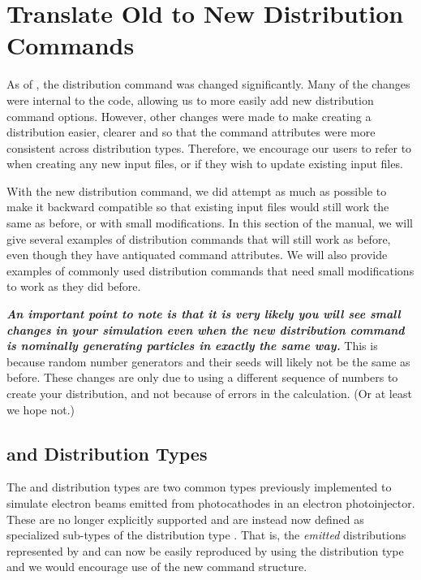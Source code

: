 \clearpage


\section{Translate Old to New Distribution Commands}
\label{sec:oldtonewdist}
As of , the distribution command  was changed significantly. Many of the changes were internal to the code, allowing us to more easily add new distribution command options. However, other changes were made to make creating a distribution easier, clearer and so that the command attributes were more consistent across distribution types. Therefore, we encourage our users to refer to  when creating any new input files, or if they wish to update existing input files.

With the new distribution command, we did attempt as much as possible to make it backward compatible so that existing \opal input files would still work the same as before, or with small modifications. In this section of the manual, we will give several examples of distribution commands that will still work as before, even though they have antiquated command attributes. We will also provide examples of commonly used distribution commands that need small modifications to work as they did before.

\textbf{\emph{An important point to note is that it is very likely you will see small changes in your simulation even when the new distribution command is nominally generating particles in exactly the same way.}} This is because random number generators and their seeds will likely not be the same as before. These changes are only due to \opal using a different sequence of numbers to create your distribution, and not because of errors in the calculation. (Or at least we hope not.)

\subsection{ and  Distribution Types}
\label{sec:oldtonewdistgungaussandastra}
The  and  distribution types  are two common types previously implemented to simulate electron beams emitted from photocathodes in an electron photoinjector. These are no longer explicitly supported and are instead now defined as specialized sub-types of the distribution type . That is, the \emph{emitted} distributions represented by  and  can now be easily reproduced by using the  distribution type and we would encourage use of the new command structure.

